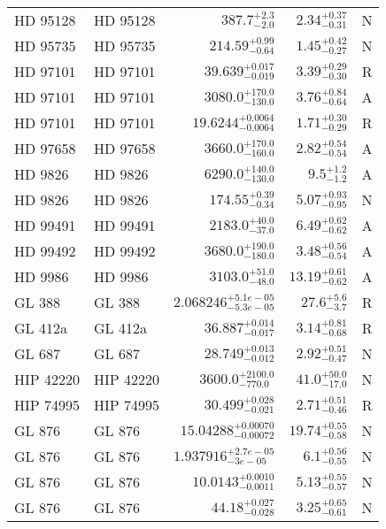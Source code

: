 \begin{longtable*}{llrrr}
HD 95128 & HD 95128 & $387.7^{+2.3}_{-2.0}$ & $2.34^{+0.37}_{-0.31}$ & N \\ 
HD 95735 & HD 95735 & $214.59^{+0.99}_{-0.64}$ & $1.45^{+0.42}_{-0.27}$ & N \\ 
HD 97101 & HD 97101 & $39.639^{+0.017}_{-0.019}$ & $3.39^{+0.29}_{-0.30}$ & R \\ 
HD 97101 & HD 97101 & $3080.0^{+170.0}_{-130.0}$ & $3.76^{+0.84}_{-0.64}$ & A \\ 
HD 97101 & HD 97101 & $19.6244^{+0.0064}_{-0.0064}$ & $1.71^{+0.30}_{-0.29}$ & R \\ 
HD 97658 & HD 97658 & $3660.0^{+170.0}_{-160.0}$ & $2.82^{+0.54}_{-0.54}$ & A \\ 
HD 9826 & HD 9826 & $6290.0^{+140.0}_{-130.0}$ & $9.5^{+1.2}_{-1.2}$ & A \\ 
HD 9826 & HD 9826 & $174.55^{+0.39}_{-0.34}$ & $5.07^{+0.93}_{-0.95}$ & N \\ 
HD 99491 & HD 99491 & $2183.0^{+40.0}_{-37.0}$ & $6.49^{+0.62}_{-0.62}$ & A \\ 
HD 99492 & HD 99492 & $3680.0^{+190.0}_{-180.0}$ & $3.48^{+0.56}_{-0.54}$ & A \\ 
HD 9986 & HD 9986 & $3103.0^{+51.0}_{-48.0}$ & $13.19^{+0.61}_{-0.62}$ & A \\ 
GL 388 & GL 388 & $2.068246^{+5.1e-05}_{-5.3e-05}$ & $27.6^{+5.6}_{-3.7}$ & R \\ 
GL 412a & GL 412a & $36.887^{+0.014}_{-0.017}$ & $3.14^{+0.81}_{-0.68}$ & R \\ 
GL 687 & GL 687 & $28.749^{+0.013}_{-0.012}$ & $2.92^{+0.51}_{-0.47}$ & N \\ 
HIP 42220 & HIP 42220 & $3600.0^{+2100.0}_{-770.0}$ & $41.0^{+50.0}_{-17.0}$ & N \\ 
HIP 74995 & HIP 74995 & $30.499^{+0.028}_{-0.021}$ & $2.71^{+0.51}_{-0.46}$ & R \\ 
GL 876 & GL 876 & $15.04288^{+0.00070}_{-0.00072}$ & $19.74^{+0.55}_{-0.58}$ & N \\ 
GL 876 & GL 876 & $1.937916^{+2.7e-05}_{-3e-05}$ & $6.1^{+0.56}_{-0.55}$ & N \\ 
GL 876 & GL 876 & $10.0143^{+0.0010}_{-0.0011}$ & $5.13^{+0.55}_{-0.57}$ & N \\ 
GL 876 & GL 876 & $44.18^{+0.027}_{-0.028}$ & $3.25^{+0.65}_{-0.61}$ & N \\ 
\bottomrule 
\end{longtable*} 
